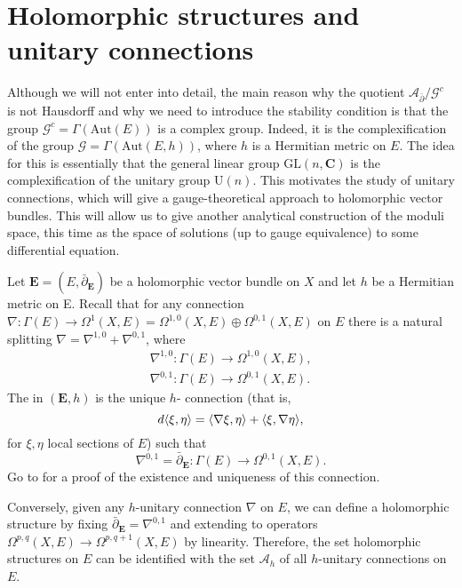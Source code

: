 \documentclass[12pt,a4paper]{book}
\theoremstyle{definition} \newtheorem{defn}[thm]{Definition}
\theoremstyle{definition} \newtheorem{ejemplo}[thm]{Example}
\theoremstyle{remark} \newtheorem*{rem}{Remark}
\def\AA{\mathscr{A}}
\def\GG{\mathscr{G}}
\def\CC{\mathbf{C}}
\def\Aut{\mathrm{Aut}}
\def\delbar{\bar{\partial}}
\newcommand{\ve}[1]{\mathbf{#1}}
\let\emph\relax
\DeclarePairedDelimiter\esc{\langle}{\rangle}
\begin{document}
	   \section{Holomorphic structures and unitary connections}
	   Although we will not enter into detail, the main reason why the quotient $\AA_{\delbar}/\GG^c$ is not Hausdorff and why we need to introduce the stability condition is that the group $\GG^c=\Gamma(\Aut(E))$ is a complex group. Indeed, it is the complexification of the group $\GG=\Gamma(\Aut(E,h))$, where $h$ is a Hermitian metric on $E$. The idea for this is essentially that the general linear group $\mathrm{GL}(n,\CC)$ is the complexification of the unitary group $\mathrm{U}(n)$. This motivates the study of unitary connections,
which will give a gauge-theoretical approach to holomorphic vector bundles. This will allow us to give another analytical construction of the moduli space, this time as the space of solutions (up to gauge equivalence) to some differential equation.

Let $\ve{E}=(E,\delbar_{\ve{E}})$ be a holomorphic vector bundle on $X$ and let $h$ be a Hermitian metric on E. Recall that for any connection $\nabla:\Gamma(E) \rightarrow \Omega^1(X,E)=\Omega^{1,0}(X,E) \oplus \Omega^{0,1}(X,E)$ on $E$ there is a natural splitting $\nabla=\nabla^{1,0}+\nabla^{0,1}$, where
\begin{align*}
  \nabla^{1,0}:\Gamma(E) \longrightarrow \Omega^{1,0}(X,E), \\
  \nabla^{0,1}:\Gamma(E) \longrightarrow \Omega^{0,1}(X,E).
\end{align*}
The \emph{Chern connection} in $(\ve{E},h)$ is the unique $h$-\emph{unitary} connection (that is, $$d\esc{\xi,\eta}=\esc{\nabla \xi,\eta} + \esc{\xi,\nabla \eta},$$ for $\xi, \eta$ local sections of $E$) such that $$\nabla^{0,1}= \delbar_{\ve{E}}:\Gamma(E) \rightarrow \Omega^{0,1}(X,E).$$ Go to \cite{wells} for a proof of the existence and uniqueness of this connection. 

Conversely, given any $h$-unitary connection $\nabla$ on $E$, we can define a holomorphic structure by fixing $\delbar_{\ve{E}}=\nabla^{0,1}$ and extending to operators $\Omega^{p,q}(X,E) \rightarrow \Omega^{p,q+1}(X,E)$ by linearity. Therefore, the set holomorphic structures on $E$ can be identified with the set $\AA_h$ of all $h$-unitary connections on $E$.
\end{document}
